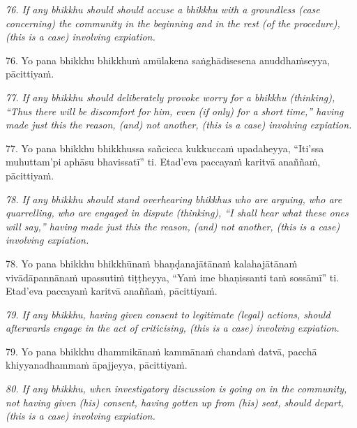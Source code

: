 \documentclass[11pt]{article}
\begin{document}
\begin{paracol}{2}
\begin{column}
{\itshape\footnotesize
76. If any bhikkhu should should accuse a bhikkhu with a groundless (case concerning) the community in the beginning and in the rest (of the procedure), (this is a case) involving expiation.
}
\switchcolumn

\begin{flushleft}
76. Yo pana bhikkhu bhikkhuṁ amūlakena saṅghādisesena anuddhaṁseyya, pācittiyaṁ.
\switchcolumn*
\end{flushleft}

{\itshape\footnotesize
77. If any bhikkhu should deliberately provoke worry for a bhikkhu (thinking), “Thus there will be discomfort for him, even (if only) for a short time,” having made just this the reason, (and) not another, (this is a case) involving expiation.
}
\switchcolumn

\begin{flushleft}
77. Yo pana bhikkhu bhikkhussa sañcicca kukkuccaṁ upadaheyya, “Iti’ssa muhuttam’pi aphāsu bhavissatī” ti. Etad’eva paccayaṁ karitvā anaññaṁ, pācittiyaṁ.
\switchcolumn*
\end{flushleft}

{\itshape\footnotesize
78. If any bhikkhu should stand overhearing bhikkhus who are arguing, who are quarrelling, who are engaged in dispute (thinking), “I shall hear what these ones will say,” having made just this the reason, (and) not another, (this is a case) involving expiation.
}
\switchcolumn

\begin{flushleft}
78. Yo pana bhikkhu bhikkhūnaṁ bhaṇḍanajātānaṁ kalahajātānaṁ vivādāpannānaṁ upassutiṁ tiṭṭheyya, “Yaṁ ime bhaṇissanti taṁ sossāmī” ti. Etad’eva paccayaṁ karitvā anaññaṁ, pācittiyaṁ.
\switchcolumn*
\end{flushleft}

{\itshape\footnotesize
79. If any bhikkhu, having given consent to legitimate (legal) actions, should afterwards engage in the act of criticising, (this is a case) involving expiation.
}
\switchcolumn

\begin{flushleft}
79. Yo pana bhikkhu dhammikānaṁ kammānaṁ chandaṁ datvā, pacchā khiyyanadhammaṁ āpajjeyya, pācittiyaṁ.
\switchcolumn*
\end{flushleft}

{\itshape\footnotesize
80. If any bhikkhu, when investigatory discussion is going on in the community, not having given (his) consent, having gotten up from (his) seat, should depart, (this is a case) involving expiation.
}
\switchcolumn


\end{column}
\end{paracol}
\end{document}

